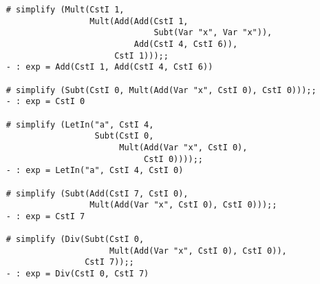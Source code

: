 \documentclass[addpoints]{exam}
\begin{document}
\begin{questions}
  \begin{verbatim}
    # simplify (Mult(CstI 1,
                     Mult(Add(Add(CstI 1,
                                  Subt(Var "x", Var "x")),
                              Add(CstI 4, CstI 6)),
                          CstI 1)));;
    - : exp = Add(CstI 1, Add(CstI 4, CstI 6))
    
    # simplify (Subt(CstI 0, Mult(Add(Var "x", CstI 0), CstI 0)));;
    - : exp = CstI 0
    
    # simplify (LetIn("a", CstI 4,
                      Subt(CstI 0,
                           Mult(Add(Var "x", CstI 0),
                                CstI 0))));;
    - : exp = LetIn("a", CstI 4, CstI 0)

    # simplify (Subt(Add(CstI 7, CstI 0),
                     Mult(Add(Var "x", CstI 0), CstI 0)));;
    - : exp = CstI 7

    # simplify (Div(Subt(CstI 0,
                         Mult(Add(Var "x", CstI 0), CstI 0)),
                    CstI 7));;
    - : exp = Div(CstI 0, CstI 7)
  \end{verbatim}

  \begin{solutionbox}{11cm}
    \inputminted{ocaml}{simplify.ml}
  \end{solutionbox}
  
\end{questions}
\end{document}
